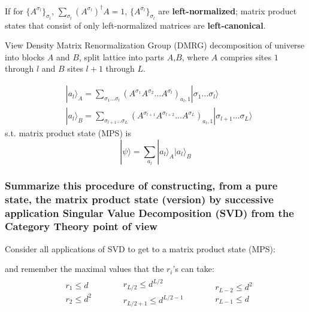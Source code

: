 \documentclass[10pt]{amsart}
\begin{document}
\begin{multicols*}{2}
If for $\lbrace A^{\sigma_l} \rbrace_{\sigma_l} $, $\sum_{\sigma_l} (A^{\sigma_l})^{\dag} A = 1$, $\lbrace A^{\sigma_l} \rbrace_{\sigma_l}$ are \textbf{left-normalized}; matrix product states that consist of only left-normalized matrices are \textbf{left-canonical}.  

View Density Matrix Renormalization Group (DMRG) decomposition of universe into blocks $A$ and $B$, split lattice into parts $A$,$B$, where $A$ compries sites $1$ through $l$ and $B$ sites $l+1$ through $L$.  

\[
\begin{aligned}
	& | a_l \rangle_A = \sum_{\sigma_1 \dots \sigma_l} (A^{\sigma_1} A^{\sigma_2} \dots A^{\sigma_l} )_{a_l,1} | \sigma_1 \dots \sigma_l \rangle \\ 
		& | a_l \rangle_B = \sum_{\sigma_{l+1} \dots \sigma_L} (A^{\sigma_{l+1}} A^{\sigma_{l+2}} \dots A^{\sigma_L} )_{a_l,1} | \sigma_{l+1} \dots \sigma_L \rangle 
\end{aligned}
\]
s.t. matrix product state (MPS) is 
\[
|\psi \rangle =\sum_{a_l} | a_l \rangle_A | a_l \rangle_B
\]

\subsubsection{Summarize this procedure of constructing, from a pure state, the matrix product state (version) by successive application Singular Value Decomposition (SVD) from the Category Theory point of view}

Consider all applications of SVD to get to a matrix product state (MPS): 
and remember the maximal values that the $r_i$'s can take:
\[
\begin{gathered}
	\begin{aligned}
& r_1 \leq d \\ 
	& r_2 \leq d^2 
\end{aligned}	 \qquad \, 	\begin{aligned}
& r_{L/2} \leq d^{L/2} \\ 
	& r_{L/2+1} \leq d^{L/2-1} 
\end{aligned} \qquad \, 	\begin{aligned}
& r_{L-2} \leq d^2 \\ 
	& r_{L-1} \leq d 
\end{aligned}
\end{gathered}
\]


\end{multicols*}
\end{document}

